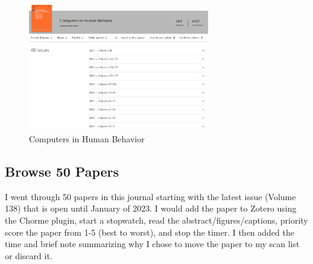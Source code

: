 \documentclass[a4paper]{article}
\begin{document}
\begin{figure}[!htb]
\centering
\includegraphics[width=0.7\textwidth]{figures/j02.PNG}
\caption{\label{fig:search} Computers in Human Behavior \cite{noauthor_editorial_2022}}
\end{figure}

\subsection{Browse 50 Papers}
I went through 50 papers in this journal starting with the latest issue (Volume 138) that is open until January of 2023. I would add the paper to Zotero using the Chorme plugin, start a stopwatch, read the abstract/figures/captions, priority score the paper from 1-5 (best to worst), and stop the timer. I then added the time and brief note summarizing why I chose to move the paper to my scan list or discard it.
\end{document}
